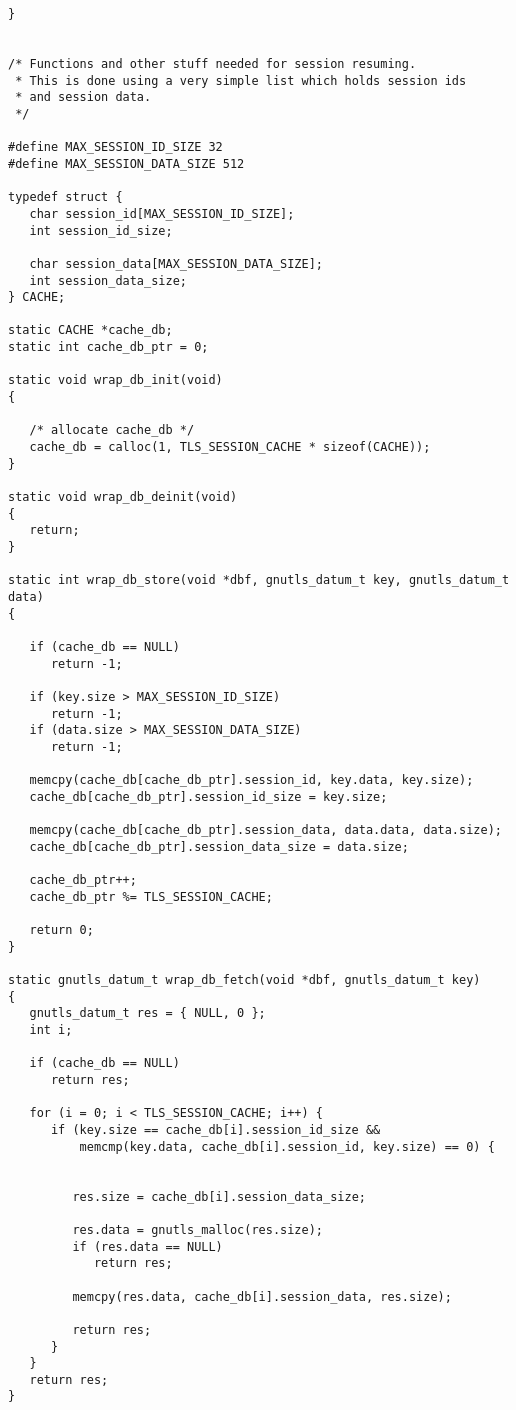 \begin{verbatim}
}


/* Functions and other stuff needed for session resuming.
 * This is done using a very simple list which holds session ids
 * and session data.
 */

#define MAX_SESSION_ID_SIZE 32
#define MAX_SESSION_DATA_SIZE 512

typedef struct {
   char session_id[MAX_SESSION_ID_SIZE];
   int session_id_size;

   char session_data[MAX_SESSION_DATA_SIZE];
   int session_data_size;
} CACHE;

static CACHE *cache_db;
static int cache_db_ptr = 0;

static void wrap_db_init(void)
{

   /* allocate cache_db */
   cache_db = calloc(1, TLS_SESSION_CACHE * sizeof(CACHE));
}

static void wrap_db_deinit(void)
{
   return;
}

static int wrap_db_store(void *dbf, gnutls_datum_t key, gnutls_datum_t data)
{

   if (cache_db == NULL)
      return -1;

   if (key.size > MAX_SESSION_ID_SIZE)
      return -1;
   if (data.size > MAX_SESSION_DATA_SIZE)
      return -1;

   memcpy(cache_db[cache_db_ptr].session_id, key.data, key.size);
   cache_db[cache_db_ptr].session_id_size = key.size;

   memcpy(cache_db[cache_db_ptr].session_data, data.data, data.size);
   cache_db[cache_db_ptr].session_data_size = data.size;

   cache_db_ptr++;
   cache_db_ptr %= TLS_SESSION_CACHE;

   return 0;
}

static gnutls_datum_t wrap_db_fetch(void *dbf, gnutls_datum_t key)
{
   gnutls_datum_t res = { NULL, 0 };
   int i;

   if (cache_db == NULL)
      return res;

   for (i = 0; i < TLS_SESSION_CACHE; i++) {
      if (key.size == cache_db[i].session_id_size &&
          memcmp(key.data, cache_db[i].session_id, key.size) == 0) {


         res.size = cache_db[i].session_data_size;

         res.data = gnutls_malloc(res.size);
         if (res.data == NULL)
            return res;

         memcpy(res.data, cache_db[i].session_data, res.size);

         return res;
      }
   }
   return res;
}


\end{verbatim}
